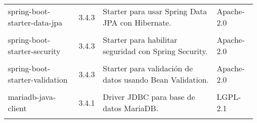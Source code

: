 \begin{longtable}[]{@{}p{}p{}p{}p{}@{}}
    \begin{minipage}[t]{0.18\columnwidth}\raggedright spring-boot-starter-data-jpa \end{minipage} & \begin{minipage}[t]{0.10\columnwidth}\raggedright 3.4.3 \end{minipage} & \begin{minipage}[t]{0.49\columnwidth}\raggedright Starter para usar Spring Data JPA con Hibernate. \end{minipage} & \begin{minipage}[t]{0.11\columnwidth}\raggedright Apache-2.0 \end{minipage} \\ \tabularnewline

    \begin{minipage}[t]{0.18\columnwidth}\raggedright spring-boot-starter-security \end{minipage} & \begin{minipage}[t]{0.10\columnwidth}\raggedright 3.4.3 \end{minipage} & \begin{minipage}[t]{0.49\columnwidth}\raggedright Starter para habilitar seguridad con Spring Security. \end{minipage} & \begin{minipage}[t]{0.11\columnwidth}\raggedright Apache-2.0 \end{minipage} \\ \tabularnewline

    \begin{minipage}[t]{0.18\columnwidth}\raggedright spring-boot-starter-validation \end{minipage} & \begin{minipage}[t]{0.10\columnwidth}\raggedright 3.4.3 \end{minipage} & \begin{minipage}[t]{0.49\columnwidth}\raggedright Starter para validación de datos usando Bean Validation. \end{minipage} & \begin{minipage}[t]{0.11\columnwidth}\raggedright Apache-2.0 \end{minipage} \\ \tabularnewline

    \begin{minipage}[t]{0.18\columnwidth}\raggedright mariadb-java-client \end{minipage} & \begin{minipage}[t]{0.10\columnwidth}\raggedright 3.4.1 \end{minipage} & \begin{minipage}[t]{0.49\columnwidth}\raggedright Driver JDBC para base de datos MariaDB. \end{minipage} & \begin{minipage}[t]{0.11\columnwidth}\raggedright LGPL-2.1 \end{minipage} \\ \tabularnewline


\end{longtable}
